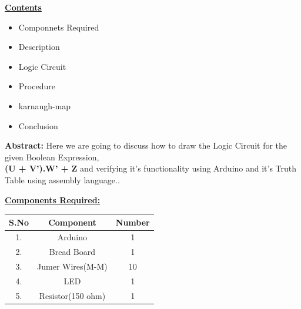 \documentclass[10pt,a4paper]{report}
\begin{document}
\begin{multicols}{2} \raggedright \large \textbf{\underline{Contents}} \normalsize \vspace{5mm}
\begin{itemize}
\raggedright  \item Componnets Required \item Description \item Logic Circuit \item Procedure \item karnaugh-map \item Conclusion
\end{itemize} \vspace{5mm}
\raggedright \hspace{10mm} \textbf{Abstract:}  Here we are going to discuss how to draw the Logic Circuit for the given Boolean Expression,\\  \textbf{(U + V').W' + Z} and verifying it's functionality using Arduino and it's Truth Table using assembly language..\vspace{5mm} 
\\ \raggedright \large \textbf{\underline{Components Required:}} \normalsize \vspace{3mm}

\begin{center}
    \setlength{\arrayrulewidth}{0.1mm}
\setlength{\tabcolsep}{12pt}
\renewcommand{\arraystretch}{1.5}
    \begin{tabular}{|c|c|c|}
    \hline %
      \textbf{S.No} & \textbf{Component} & \textbf{Number}\\
      \hline
	1. & Arduino & 1 \\
	2. & Bread Board & 1 \\
	3. & Jumer Wires(M-M) & 10 \\
	4. & LED & 1 \\
	5. & Resistor(150 ohm) & 1 \\ 
      \hline
      

\end{tabular}
\end{center}
\end{multicols}
\end{document}

